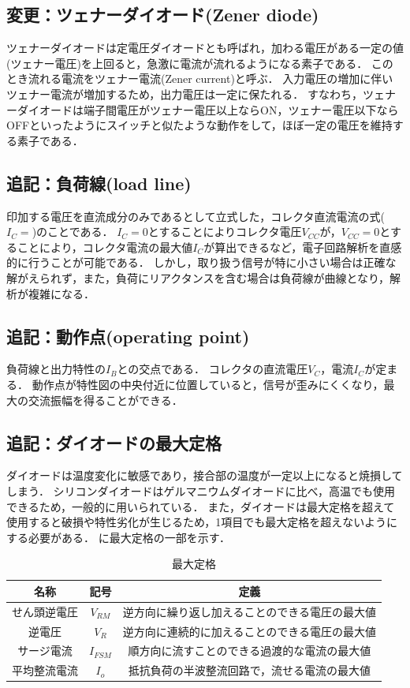 \subsection{変更：ツェナーダイオード(Zener diode)}
ツェナーダイオードは定電圧ダイオードとも呼ばれ，加わる電圧がある一定の値(ツェナー電圧)を上回ると，急激に電流が流れるようになる素子である．
このとき流れる電流をツェナー電流(Zener current)と呼ぶ．
入力電圧の増加に伴いツェナー電流が増加するため，出力電圧は一定に保たれる．
すなわち，ツェナーダイオードは端子間電圧がツェナー電圧以上ならON，ツェナー電圧以下ならOFFといったようにスイッチと似たような動作をして，ほぼ一定の電圧を維持する素子である．

\subsection{追記：負荷線(load line)\cite{1130282271098}\cite{1130000795906158592}}
印加する電圧を直流成分のみであるとして立式した，コレクタ直流電流の式($I_{C}=$)のことである．
$I_{C}=0$とすることによりコレクタ電圧$V_{CC}$が，$V_{CC}=0$とすることにより，コレクタ電流の最大値$I_{C}$が算出できるなど，電子回路解析を直感的に行うことが可能である．
しかし，取り扱う信号が特に小さい場合は正確な解がえられず，また，負荷にリアクタンスを含む場合は負荷線が曲線となり，解析が複雑になる．

\subsection{追記：動作点(operating point)\cite{1130282271098}\cite{1130000795906158592}}
負荷線と出力特性の$I_B$との交点である．
コレクタの直流電圧$V_C$，電流$I_C$が定まる．
動作点が特性図の中央付近に位置していると，信号が歪みにくくなり，最大の交流振幅を得ることができる．

\subsection{追記：ダイオードの最大定格\cite{113028227109820326432}}
ダイオードは温度変化に敏感であり，接合部の温度が一定以上になると焼損してしまう．
シリコンダイオードはゲルマニウムダイオードに比べ，高温でも使用できるため，一般的に用いられている．
また，ダイオードは最大定格を超えて使用すると破損や特性劣化が生じるため，1項目でも最大定格を超えないようにする必要がある．
に最大定格の一部を示す．

\begin{table}[h]
\centering
\caption{最大定格}
\label{tab:max}
\begin{tabular}{ccc}
\hline
名称     & 記号 & 定義     \\
\hline
せん頭逆電圧 &  $V_{RM}$  & 逆方向に繰り返し加えることのできる電圧の最大値 \\
逆電圧    &   $V_{R}$ & 逆方向に連続的に加えることのできる電圧の最大値 \\
サージ電流  & $I_{FSM}$   & 順方向に流すことのできる過渡的な電流の最大値  \\
平均整流電流 &  $I_{o}$  & 抵抗負荷の半波整流回路で，流せる電流の最大値 \\
\hline
\end{tabular}
\end{table}

